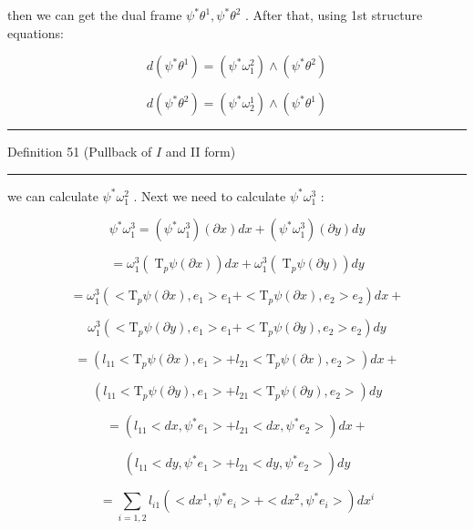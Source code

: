 \documentclass[lang=cn,a4paper,11pt,openany,twoside]{elegantbook}
\newcommand{\HRule}{\begin{center}\rule{0.9\linewidth}{0.2mm}\end{center}}
\begin{document}
then we can get the dual frame \({\psi }^{ * }{\theta }^{1},{\psi }^{ * }{\theta }^{2}\) . After that, using 1st structure equations:

\[
d\left( {{\psi }^{ * }{\theta }^{1}}\right)  = \left( {{\psi }^{ * }{\omega }_{1}^{2}}\right)  \land  \left( {{\psi }^{ * }{\theta }^{2}}\right)
\]

\[
d\left( {{\psi }^{ * }{\theta }^{2}}\right)  = \left( {{\psi }^{ * }{\omega }_{2}^{1}}\right)  \land  \left( {{\psi }^{ * }{\theta }^{1}}\right)
\]

\HRule

Definition 51 (Pullback of \(I\) and II form)

\HRule

we can calculate \({\psi }^{ * }{\omega }_{1}^{2}\) . Next we need to calculate \({\psi }^{ * }{\omega }_{1}^{3}\) :

\[
{\psi }^{ * }{\omega }_{1}^{3} = \left( {{\psi }^{ * }{\omega }_{1}^{3}}\right) \left( {\partial x}\right) {dx} + \left( {{\psi }^{ * }{\omega }_{1}^{3}}\right) \left( {\partial y}\right) {dy}
\]

\[
= {\omega }_{1}^{3}\left( {{\mathrm{\;T}}_{p}\psi \left( {\partial x}\right) }\right) {dx} + {\omega }_{1}^{3}\left( {{\mathrm{\;T}}_{p}\psi \left( {\partial y}\right) }\right) {dy}
\]

\[
= {\omega }_{1}^{3}\left( { < {\mathrm{T}}_{p}\psi \left( {\partial x}\right) ,{e}_{1} > {e}_{1} +  < {\mathrm{T}}_{p}\psi \left( {\partial x}\right) ,{e}_{2} > {e}_{2}}\right) {dx} +
\]

\[
{\omega }_{1}^{3}\left( { < {\mathrm{T}}_{p}\psi \left( {\partial y}\right) ,{e}_{1} > {e}_{1} +  < {\mathrm{T}}_{p}\psi \left( {\partial y}\right) ,{e}_{2} > {e}_{2}}\right) {dy}
\]

\[
= \left( {{l}_{11} < {\mathrm{T}}_{p}\psi \left( {\partial x}\right) ,{e}_{1} >  + {l}_{21} < {\mathrm{T}}_{p}\psi \left( {\partial x}\right) ,{e}_{2} > }\right) {dx} +
\]

\[
\left( {{l}_{11} < {\mathrm{T}}_{p}\psi \left( {\partial y}\right) ,{e}_{1} >  + {l}_{21} < {\mathrm{T}}_{p}\psi \left( {\partial y}\right) ,{e}_{2} > }\right) {dy}
\]

\[
= \left( {{l}_{11} < {dx},{\psi }^{ * }{e}_{1} >  + {l}_{21} < {dx},{\psi }^{ * }{e}_{2} > }\right) {dx} +
\]

\[
\left( {{l}_{11} < {dy},{\psi }^{ * }{e}_{1} >  + {l}_{21} < {dy},{\psi }^{ * }{e}_{2} > }\right) {dy}
\]

\[
= \mathop{\sum }\limits_{{i = 1,2}}{l}_{i1}\left( { < d{x}^{1},{\psi }^{ * }{e}_{i} >  +  < d{x}^{2},{\psi }^{ * }{e}_{i} > }\right) d{x}^{i}
\]
\end{document}
